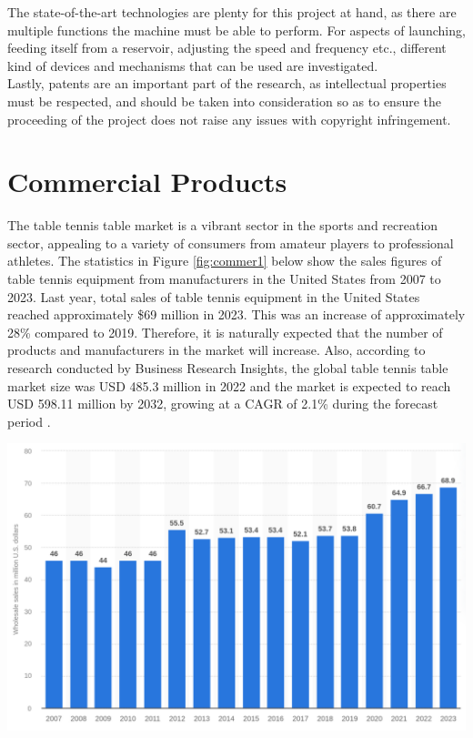 \documentclass[12pt]{report}
\begin{document}
The state-of-the-art technologies are plenty for this project at hand, as there are multiple functions the machine must be able to perform. For aspects of launching, feeding itself from a reservoir, adjusting the speed and frequency etc., different kind of devices and mechanisms that can be used are investigated. \\

Lastly, patents are an important part of the research, as intellectual properties must be respected, and should be taken into consideration so as to ensure the proceeding of the project does not raise any issues with copyright infringement.

\section{Commercial Products}

\begin{minipage}{0.6\textwidth}
    The table tennis table market is a vibrant sector in the sports and recreation sector, appealing to a variety of consumers from amateur players to professional athletes. The statistics in Figure \ref{fig:commer1} below show the sales figures of table tennis equipment from manufacturers in the United States from 2007 to 2023. Last year, total sales of table tennis equipment in the United States reached approximately \$69 million in 2023. This was an increase of approximately 28\% compared to 2019. Therefore, it is naturally expected that the number of products and manufacturers in the market will increase. Also, according to research conducted by Business Research Insights, the global table tennis table market size was USD 485.3 million in 2022 and the market is expected to reach USD 598.11 million by 2032, growing at a CAGR of 2.1\% during the forecast period \cite{table_tennis_market_2032}.
\end{minipage}
\begin{minipage}{0.38\textwidth}
    \centering
    \includegraphics[width=\textwidth]{figures/wholesales.png}
    \label{fig:commer1}
\end{minipage}
\end{document}
